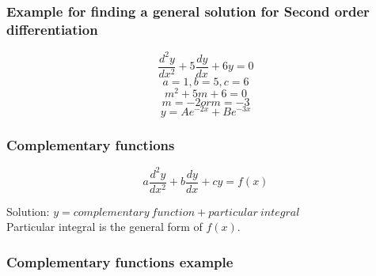 \documentclass[a4paper,9pt]{scrartcl}
\begin{document}
    \subsubsection{Example for finding a general solution for Second order differentiation}

    \begin{displaymath}
        \frac{d^{2}y}{dx^2} + 5\frac{dy}{dx} + 6y = 0
    \end{displaymath}
    \begin{displaymath}
        a = 1, b = 5, c = 6
    \end{displaymath}
    \begin{displaymath}
        m^2 + 5m + 6 = 0
    \end{displaymath}
    \begin{displaymath}
        m = -2 or m = -3
    \end{displaymath}
    \begin{displaymath}
        y = Ae^{-2x}+Be^{-3x}
    \end{displaymath}

    \subsubsection{Complementary functions}

    \begin{displaymath}
        a\frac{d^{2}y}{dx^2} + b\frac{dy}{dx} + cy = f(x)
    \end{displaymath}

    Solution: $y = complementary\ function + particular\ integral$ \\

    Particular integral is the general form of $f(x)$. \\

    \subsubsection{Complementary functions example}
\end{document}
